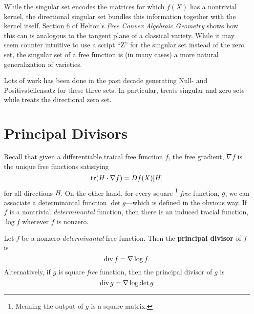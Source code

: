 While the singular set encodes the matrices for which \(f(X)\) has a nontrivial
kernel, the directional singular set bundles this information together with the
kernel itself. Section 6 of Helton's \emph{Free Convex Algebraic Geometry}
\cite{heltonFree2013} shows how this can is analogous to the tangent plane of a
classical variety.  While it may seem counter intuitive to use a script ``Z''
for the singular set instead of the zero set, the singular set of a free
function is (in many cases) a more natural generalization of varieties.

{\color{fgreen} Lots of work has been done in the past decade} generating Null- and
Positivstellensatz for these three sets. In particular,
\cite{heltonFactorization2019} treats singular and zero sets while
\cite{heltonStrong2007} treats the directional zero set.

\section{Principal Divisors}%
\label{sec:prindiv}

Recall that given a differentiable traical free function \(f\), the free
gradient, \(\nabla f\) is the unique free functions satisfying
\[
  \operatorname{tr} (H \cdot \nabla f) = Df(X)[H]
\]
for all directions \(H\). On the other hand, for every square
\footnote{Meaning the output of \(g\) is a square matrix.}
\emph{free} function, \(g\), we can associate a determinantal function
\(\det g\)---which is defined in the obvious way. If \(f\) is a nontrivial
\emph{determinantal} function, then there is an induced tracial function,
\(\log f\) wherever \(f\) is nonzero.

%

\begin{definition}%
\label{def:princdiv}
Let \(f\) be a nonzero \emph{determinantal} free function. Then the
\textbf{principal divisor} of \(f\) is
\[
  \operatorname{div} f = \nabla \log f.
\]
Alternatively, if \(g\) is square \emph{free} function, then the principal divisor of
\(g\) is
\[
  \operatorname{div} g = \nabla \log \det g
\]
\end{definition}

